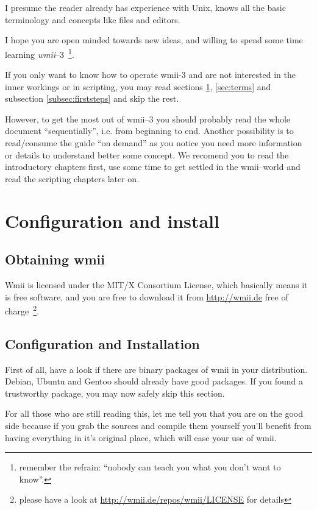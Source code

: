 \documentclass[12pt,a4paper]{article} %
\newcommand{\hrefx}[1]{\href{#1}{#1}} %
\newcommand{\wmii}{\emph{wmii}}
\begin{document}
    I presume the reader already has experience with Unix, knows all
    the basic terminology and concepts like files and editors.

    I hope you are open minded towards new ideas, and willing to spend some
    time learning \wmii--3~\footnote{remember the refrain: ``nobody
    can teach you what you don't want to know''.}.

    If you only want to know how to operate wmii-3 and are not
    interested in the inner workings or in scripting, you may read
    sections \ref{sec:conf&install}, \ref{sec:terms} and subsection
    \ref{subsec:firststeps} and skip the rest.

    However, to get the most out of wmii--3 you should probably read
    the whole document ``sequentially'', i.e. from beginning to end.
    Another possibility is to read/consume the guide ``on demand'' as
    you notice you need more information or details to understand
    better some concept. We recomend you to read the introductory
    chapters first, use some time to get settled in the wmii--world
    and read the scripting chapters later on.
    
    \section{Configuration and install}
    \label{sec:conf&install}

    \subsection{Obtaining wmii}

    Wmii is licensed under the MIT/X Consortium License, which
    basically means it is free software, and you are free to download
    it from \hrefx{http://wmii.de} free of charge~\footnote{ please have
      a look at \hrefx{http://wmii.de/repos/wmii/LICENSE}  for
      details}.
    
    \subsection{Configuration and Installation}
    
    First of all, have a look if there are binary packages of wmii in
    your distribution. Debian, Ubuntu and Gentoo should already have
    good packages. If you found a trustworthy package, you may now safely
    skip this section.

    For all those who are still reading this, let me tell you that you are
    on the good side because if you grab the sources and compile them yourself
    you'll benefit from having everything in it's original place, which will
    ease your use of wmii.
    
\end{document}
